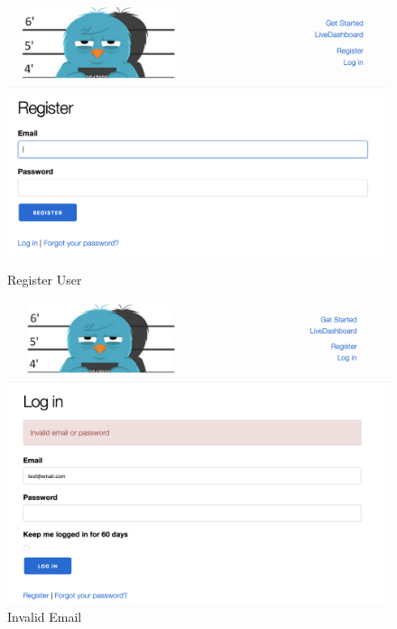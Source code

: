 \begin{figure}[htbp]
	\centering
	
	\begin{minipage}[b]{0.45\textwidth}
		\centering
		\includegraphics[width=\linewidth]{figures/FT_register.png}
		\caption{Register User}
		\label{fig:register}
	\end{minipage}
	\hfill
	\begin{minipage}[b]{0.45\textwidth}
		\centering
		\includegraphics[width=\linewidth]{figures/inv_email.png}
		\caption{Invalid Email}
		\label{fig:inv}
	\end{minipage}

\end{figure}

